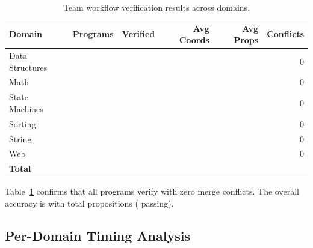 \documentclass[11pt]{article}
\begin{document}
\begin{table}[t]
\centering
\caption{Team workflow verification results across domains.}
\label{tab:team-results}
\begin{tabular}{lrrrrr}
\toprule
\textbf{Domain} & \textbf{Programs} & \textbf{Verified} &
  \textbf{Avg Coords} & \textbf{Avg Props} & \textbf{Conflicts} \\
\midrule
Data Structures & \expDomainDsCount{} & \expDomainDsVerified{} &
  \expDomainDsAvgCoords{} & \expDomainDsAvgProps{} & 0 \\
Math            & \expDomainMathCount{} & \expDomainMathVerified{} &
  \expDomainMathAvgCoords{} & \expDomainMathAvgProps{} & 0 \\
State Machines  & \expDomainSmCount{} & \expDomainSmVerified{} &
  \expDomainSmAvgCoords{} & \expDomainSmAvgProps{} & 0 \\
Sorting         & \expDomainSortCount{} & \expDomainSortVerified{} &
  \expDomainSortAvgCoords{} & \expDomainSortAvgProps{} & 0 \\
String          & \expDomainStrCount{} & \expDomainStrVerified{} &
  \expDomainStrAvgCoords{} & \expDomainStrAvgProps{} & 0 \\
Web             & \expDomainWebCount{} & \expDomainWebVerified{} &
  \expDomainWebAvgCoords{} & \expDomainWebAvgProps{} & 0 \\
\midrule
\textbf{Total}  & \expTotalPrograms{} & \expVerified{} &
  \expCoordsMean{} & \expPropsMean{} & \expObstructionTotal{} \\
\bottomrule
\end{tabular}
\end{table}

Table~\ref{tab:team-results} confirms that all \expTotalPrograms{} programs
verify with zero merge conflicts. The overall accuracy is \expAccuracy{} with
\expPropsSum{} total propositions (\expPropsOkSum{} passing).

\subsection{Per-Domain Timing Analysis}
\end{document}
